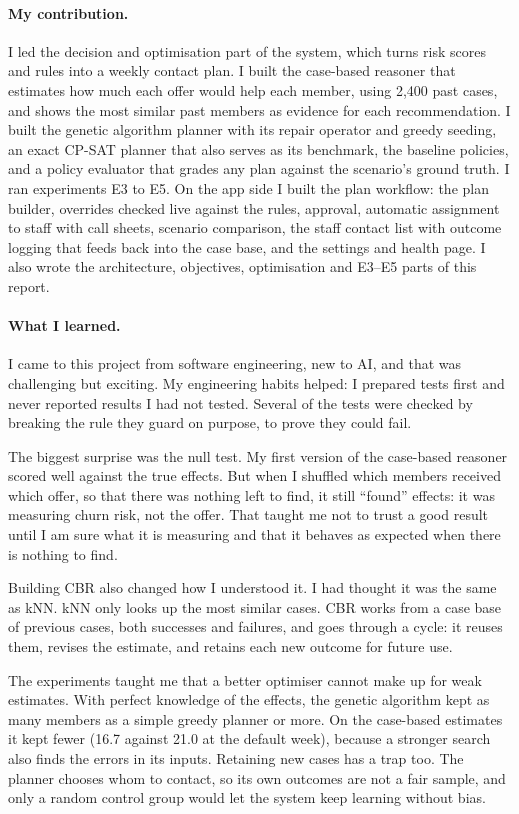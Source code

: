 \paragraph{My contribution.} I led the decision and optimisation part of the system, which turns risk scores and rules into a weekly contact plan. I built the case-based reasoner that estimates how much each offer would help each member, using 2,400 past cases, and shows the most similar past members as evidence for each recommendation. I built the genetic algorithm planner with its repair operator and greedy seeding, an exact CP-SAT planner that also serves as its benchmark, the baseline policies, and a policy evaluator that grades any plan against the scenario's ground truth. I ran experiments E3 to E5. On the app side I built the plan workflow: the plan builder, overrides checked live against the rules, approval, automatic assignment to staff with call sheets, scenario comparison, the staff contact list with outcome logging that feeds back into the case base, and the settings and health page. I also wrote the architecture, objectives, optimisation and E3--E5 parts of this report.

\paragraph{What I learned.} I came to this project from software engineering, new to AI, and that was challenging but exciting. My engineering habits helped: I prepared tests first and never reported results I had not tested. Several of the tests were checked by breaking the rule they guard on purpose, to prove they could fail.

The biggest surprise was the null test. My first version of the case-based reasoner scored well against the true effects. But when I shuffled which members received which offer, so that there was nothing left to find, it still ``found'' effects: it was measuring churn risk, not the offer. That taught me not to trust a good result until I am sure what it is measuring and that it behaves as expected when there is nothing to find.

Building CBR also changed how I understood it. I had thought it was the same as kNN. kNN only looks up the most similar cases. CBR works from a case base of previous cases, both successes and failures, and goes through a cycle: it reuses them, revises the estimate, and retains each new outcome for future use.

The experiments taught me that a better optimiser cannot make up for weak estimates. With perfect knowledge of the effects, the genetic algorithm kept as many members as a simple greedy planner or more. On the case-based estimates it kept fewer (16.7 against 21.0 at the default week), because a stronger search also finds the errors in its inputs. Retaining new cases has a trap too. The planner chooses whom to contact, so its own outcomes are not a fair sample, and only a random control group would let the system keep learning without bias.

